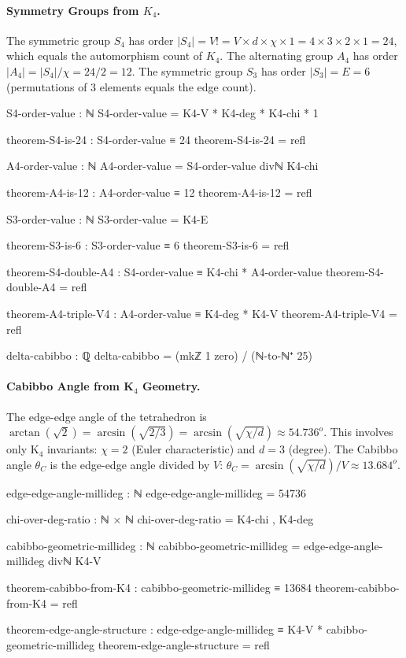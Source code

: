 \documentclass[11pt,a4paper]{book}
\def\circ{o}%
\begin{document}
\paragraph{Symmetry Groups from $K_4$.}
The symmetric group $S_4$ has order $|S_4| = V! = V \times d \times \chi \times 1 = 4 \times 3 \times 2 \times 1 = 24$, which equals the automorphism count of $K_4$. The alternating group $A_4$ has order $|A_4| = |S_4|/\chi = 24/2 = 12$. The symmetric group $S_3$ has order $|S_3| = E = 6$ (permutations of 3 elements equals the edge count).

\begin{code}
S4-order-value : ℕ
S4-order-value = K4-V * K4-deg * K4-chi * 1

theorem-S4-is-24 : S4-order-value ≡ 24
theorem-S4-is-24 = refl

A4-order-value : ℕ
A4-order-value = S4-order-value divℕ K4-chi

theorem-A4-is-12 : A4-order-value ≡ 12
theorem-A4-is-12 = refl

S3-order-value : ℕ
S3-order-value = K4-E

theorem-S3-is-6 : S3-order-value ≡ 6
theorem-S3-is-6 = refl

theorem-S4-double-A4 : S4-order-value ≡ K4-chi * A4-order-value
theorem-S4-double-A4 = refl

theorem-A4-triple-V4 : A4-order-value ≡ K4-deg * K4-V
theorem-A4-triple-V4 = refl
\end{code}

\begin{code}
delta-cabibbo : ℚ
delta-cabibbo = (mkℤ 1 zero) / (ℕ-to-ℕ⁺ 25)
\end{code}

\paragraph{Cabibbo Angle from K$_4$ Geometry.}
The edge-edge angle of the tetrahedron is $\arctan(\sqrt{2}) = \arcsin(\sqrt{2/3}) = \arcsin(\sqrt{\chi/d}) \approx 54.736^\circ$.
This involves only K$_4$ invariants: $\chi = 2$ (Euler characteristic) and $d = 3$ (degree).
The Cabibbo angle $\theta_C$ is the edge-edge angle divided by $V$:
$\theta_C = \arcsin(\sqrt{\chi/d}) / V \approx 13.684^\circ$.

\begin{code}
edge-edge-angle-millideg : ℕ
edge-edge-angle-millideg = 54736

chi-over-deg-ratio : ℕ × ℕ
chi-over-deg-ratio = K4-chi , K4-deg

cabibbo-geometric-millideg : ℕ
cabibbo-geometric-millideg = edge-edge-angle-millideg divℕ K4-V

theorem-cabibbo-from-K4 : cabibbo-geometric-millideg ≡ 13684
theorem-cabibbo-from-K4 = refl

theorem-edge-angle-structure : edge-edge-angle-millideg ≡ K4-V * cabibbo-geometric-millideg
theorem-edge-angle-structure = refl
\end{code}
\end{document}
